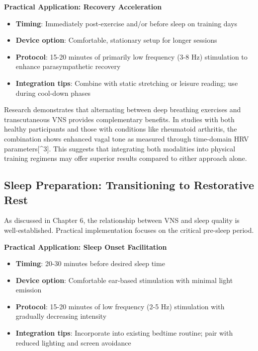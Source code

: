 \documentclass[
  Letterpaper,
]{scrbook}
\providecommand{\tightlist}{%
  \setlength{\itemsep}{0pt}\setlength{\parskip}{0pt}}\usepackage{longtable,booktabs,array}
\begin{document}
\textbf{Practical Application: Recovery Acceleration}

\begin{itemize}
\tightlist
\item
  \textbf{Timing}: Immediately post-exercise and/or before sleep on
  training days
\item
  \textbf{Device option}: Comfortable, stationary setup for longer
  sessions
\item
  \textbf{Protocol}: 15-20 minutes of primarily low frequency (3-8 Hz)
  stimulation to enhance parasympathetic recovery
\item
  \textbf{Integration tips}: Combine with static stretching or leisure
  reading; use during cool-down phases
\end{itemize}

Research demonstrates that alternating between deep breathing exercises
and transcutaneous VNS provides complementary benefits. In studies with
both healthy participants and those with conditions like rheumatoid
arthritis, the combination shows enhanced vagal tone as measured through
time-domain HRV parameters{[}\^{}3{]}. This suggests that integrating
both modalities into physical training regimens may offer superior
results compared to either approach alone.

\subsection{Sleep Preparation: Transitioning to Restorative
Rest}\label{sleep-preparation-transitioning-to-restorative-rest}

As discussed in Chapter 6, the relationship between VNS and sleep
quality is well-established. Practical implementation focuses on the
critical pre-sleep period.

\textbf{Practical Application: Sleep Onset Facilitation}

\begin{itemize}
\tightlist
\item
  \textbf{Timing}: 20-30 minutes before desired sleep time
\item
  \textbf{Device option}: Comfortable ear-based stimulation with minimal
  light emission
\item
  \textbf{Protocol}: 15-20 minutes of low frequency (2-5 Hz) stimulation
  with gradually decreasing intensity
\item
  \textbf{Integration tips}: Incorporate into existing bedtime routine;
  pair with reduced lighting and screen avoidance
\end{itemize}
\end{document}
